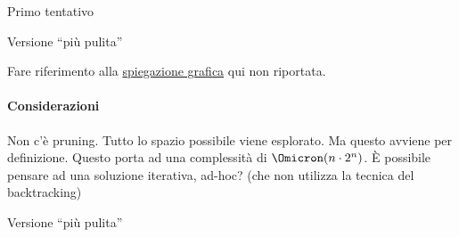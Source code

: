 \begin{minipage}[t]{.5\textwidth}
	\begin{algorithm}[H]
	\caption{Primo tentativo}


	\end{algorithm}
\end{minipage}%
\begin{minipage}[t]{.5\textwidth}
	\begin{algorithm}[H]
	\caption{Versione \enquote{più pulita}}

    \vspace{-0.85pt}
	\end{algorithm}
\end{minipage}

Fare riferimento alla \href{https://youtu.be/00hO1skHCls?t=1420}{spiegazione grafica} qui non riportata.

\paragraph{Considerazioni}
Non c'è pruning.
Tutto lo spazio possibile viene esplorato.
Ma questo avviene per definizione.
Questo porta ad una complessità di \(\Omicron(n \cdot 2^n)\).
\`{E} possibile pensare ad una soluzione iterativa, ad-hoc? (che non utilizza la tecnica del backtracking)

\begin{algorithm}[H]
\caption{Versione \enquote{più pulita}}


\end{algorithm}

